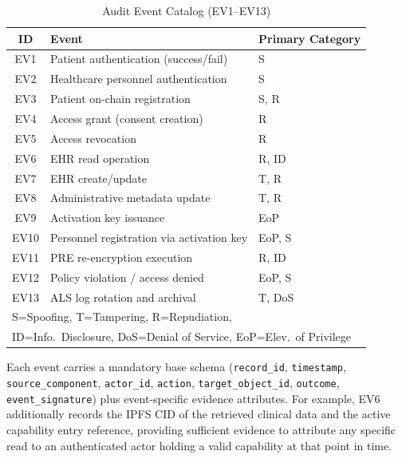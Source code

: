 \begin{table}[htbp]
    \caption{Audit Event Catalog (EV1--EV13)}
    \label{tab:event-catalog}
    \begin{center}
        \begin{tabular}{c p{4cm} l}
            \toprule
            \textbf{ID} & \textbf{Event} & \textbf{Primary Category} \\
            \midrule
            EV1  & Patient authentication (success/fail)       & S \\
            EV2  & Healthcare personnel authentication         & S \\
            EV3  & Patient on-chain registration               & S, R \\
            EV4  & Access grant (consent creation)             & R \\
            EV5  & Access revocation                           & R \\
            EV6  & EHR read operation                         & R, ID \\
            EV7  & EHR create/update                          & T, R \\
            EV8  & Administrative metadata update              & T, R \\
            EV9  & Activation key issuance                    & EoP \\
            EV10 & Personnel registration via activation key  & EoP, S \\
            EV11 & PRE re-encryption execution                & R, ID \\
            EV12 & Policy violation / access denied            & EoP, S \\
            EV13 & ALS log rotation and archival               & T, DoS \\
            \bottomrule
            \multicolumn{3}{l}{\small S=Spoofing, T=Tampering, R=Repudiation,} \\
            \multicolumn{3}{l}{\small ID=Info.\ Disclosure, DoS=Denial of Service, EoP=Elev.\ of Privilege} \\
        \end{tabular}
    \end{center}
\end{table}

Each event carries a mandatory base schema (\texttt{record\_id},
\texttt{timestamp}, \texttt{source\_component}, \texttt{actor\_id},
\texttt{action}, \texttt{target\_object\_id}, \texttt{outcome},
\texttt{event\_signature}) plus event-specific evidence attributes. For
example, EV6 additionally records the IPFS CID of the retrieved clinical
data and the active capability entry reference, providing sufficient evidence
to attribute any specific read to an authenticated actor holding a valid
capability at that point in time.

